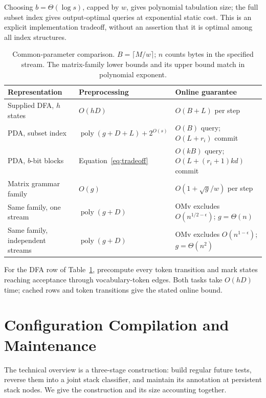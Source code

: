 \documentclass[manuscript,screen,11pt,nonacm]{acmart}
\theoremstyle{definition}\newtheorem{definition}{Definition}
\newcommand{\poly}{\operatorname{poly}}
\begin{document}
Choosing $b=\Theta(\log s)$, capped by $w$, gives polynomial tabulation size; the full subset index gives output-optimal queries at exponential static cost. This is an explicit implementation tradeoff, without an assertion that it is optimal among all index structures.

\begin{table}[t]
\caption{Common-parameter comparison. $B=\lceil M/w\rceil$; $n$ counts bytes in the specified stream. The matrix-family lower bounds and its upper bound match in polynomial exponent.}
\label{tab:bounds}
\renewcommand{\arraystretch}{1.15}
\begin{tabularx}{\linewidth}{@{}l l >{\raggedright\arraybackslash}X@{}}
\toprule
Representation & Preprocessing & Online guarantee\\\midrule
Supplied DFA, $h$ states & $O(hD)$ & $O(B+L)$ per step\\
PDA, subset index & $\poly(g+D+L)+2^{O(s)}$ & $O(B)$ query; $O(L+r_i)$ commit\\
PDA, $b$-bit blocks & Equation~\eqref{eq:tradeoff} & $O(kB)$ query; $O(L+(r_i+1)kd)$ commit\\
Matrix grammar family & $O(g)$ & $O(1+\sqrt g/w)$ per step\\
Same family, one stream & $\poly(g+D)$ & OMv excludes $O(n^{1/2-\epsilon})$; $g=\Theta(n)$\\
Same family, independent streams & $\poly(g+D)$ & OMv excludes $O(n^{1-\epsilon})$; $g=\Theta(n^2)$\\
\bottomrule
\end{tabularx}
\end{table}

For the DFA row of Table~\ref{tab:bounds}, precompute every token transition and mark states reaching acceptance through vocabulary-token edges. Both tasks take $O(hD)$ time; cached rows and token transitions give the stated online bound.

\section{Configuration Compilation and Maintenance}\label{sec:index}
The technical overview is a three-stage construction: build regular future tests, reverse them into a joint stack classifier, and maintain its annotation at persistent stack nodes. We give the construction and its size accounting together.
\end{document}
